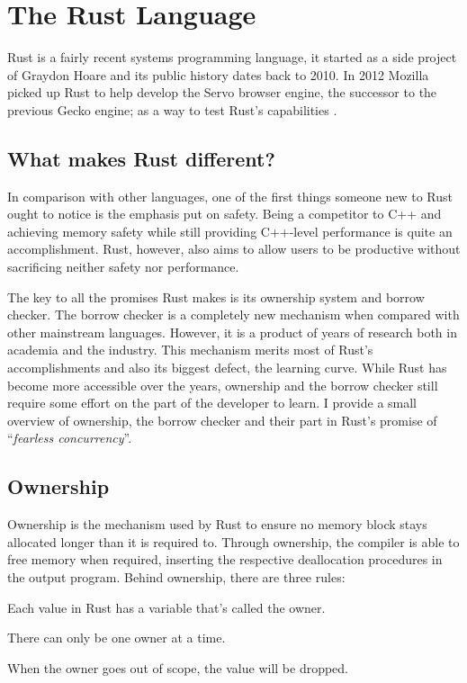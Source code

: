 \section{The Rust Language}\label{sec:rust-lang}

Rust is a fairly recent systems programming language,
it started as a side project of Graydon Hoare and its public history dates back to 2010.
In 2012 Mozilla picked up Rust to help develop the Servo browser engine, the successor to the previous Gecko engine;
as a way to test Rust's capabilities \autocite{Klabnik2016}.

\subsection{What makes Rust different?}

In comparison with other languages, one of the first things someone new to Rust ought to notice is the emphasis put on safety.
Being a competitor to C++ and achieving memory safety while still providing C++-level performance is quite an accomplishment.
Rust, however, also aims to allow users to be productive without sacrificing neither safety nor performance.

The key to all the promises Rust makes is its ownership system and borrow checker.
The borrow checker is a completely new mechanism when compared with other mainstream languages.
However, it is a product of years of research both in academia and the industry.
This mechanism merits most of Rust's accomplishments and also its biggest defect, the learning curve.
While Rust has become more accessible over the years,
ownership and the borrow checker still require some effort on the part of the developer to learn.
I provide a small overview of ownership, the borrow checker and their part in Rust's promise of “\emph{fearless concurrency}”.

\subsection{Ownership}\label{sec:rust-lang:ownership}

Ownership is the mechanism used by Rust to ensure no memory block stays allocated longer than it is required to.
Through ownership, the compiler is able to free memory when required,
inserting the respective deallocation procedures in the output program.
Behind ownership, there are three rules:

\begin{displayquote}
    \begin{compactitem}
        \item Each value in Rust has a variable that’s called the owner.
        \item There can only be one owner at a time.
        \item When the owner goes out of scope, the value will be dropped.
    \end{compactitem}
\end{displayquote}

